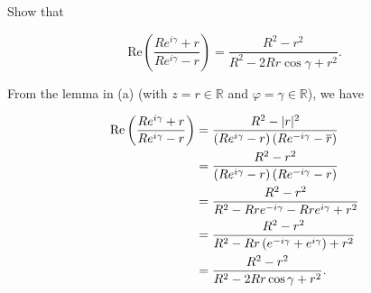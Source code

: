 Show that

$$
\text{Re} \left( \frac{Re^{i \gamma} + r}{Re^{i \gamma} - r} \right) = \frac{R^2 - r^2}{R^2 - 2 R r \cos{\gamma} + r^2}.
$$

\begin{solution}
    From the lemma in (a) (with $z = r \in \mathbb{R}$ and $\varphi = \gamma \in \mathbb{R}$), we have

    \begin{align*}
        \text{Re} \left( \frac{Re^{i \gamma} + r}{Re^{i \gamma} - r} \right)
        &= \frac{R^2 - |r|^2}{\left(Re^{i \gamma} - r\right)\left(Re^{-i \gamma} - \overline{r}\right)} \\
        &= \frac{R^2 - r^2}{\left(Re^{i \gamma} - r\right)\left(Re^{-i \gamma} - r\right)} \\
        &= \frac{R^2 - r^2}{R^2 - Rre^{-i\gamma} - Rr e^{i \gamma} + r^2} \\
        &= \frac{R^2 - r^2}{R^2 - Rr\left(e^{-i\gamma} + e^{i \gamma}\right) + r^2} \\
        &= \frac{R^2 - r^2}{R^2 - 2Rr\cos{\gamma} + r^2}.
    \end{align*}
\end{solution}